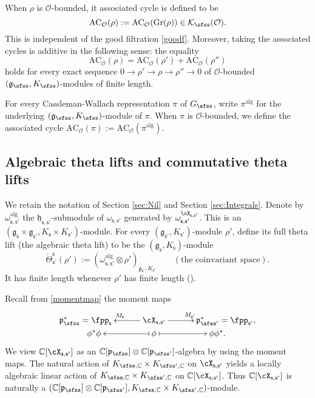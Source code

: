 \documentclass[12pt,a4paper]{amsart}
\newcommand{\CK}{{\mathcal {K}}}
\newcommand{\CO}{{\mathcal {O}}}
\newcommand{\oS}{\operatorname{S}}
\newcommand{\g}{\mathfrak g}
\newcommand{\h}{\mathfrak h}
\newcommand{\p}{\mathfrak p}
\numberwithin{equation}{section}
\theoremstyle{remark}
\begin{document}
When $\rho$ is  $\CO$-bounded, it associated cycle is defined to be
\[
   \mathrm{AC}_\CO(\rho):= \mathrm{AC}_\CO(\mathrm{Gr}(\rho))\in  \CK_\sfss(\CO).
\]
This is independent of the good filtration \eqref{goodf}. Moreover, taking the associated cycles is additive in the following sense: the equality
\[
 \mathrm{AC}_\CO(\rho)= \mathrm{AC}_\CO(\rho')+ \mathrm{AC}_\CO(\rho'')
\]
holds for every exact sequence
$0\rightarrow \rho'\rightarrow \rho\rightarrow \rho''\rightarrow 0$ of  $\CO$-bounded  $(\g_\sfss, K_{\sfss})$-modules of finite length.

For every Cassleman-Wallach representation $\pi$ of $G_\sfss$, write $\pi^{\mathrm{alg}}$ for the underlying $(\g_\sfss, K_\sfss)$-module of $\pi$. When $\pi$ is $\CO$-bounded, we define the associated cycle $\mathrm{AC}_\CO(\pi):=\mathrm{AC}_\CO(\pi^{\mathrm{alg}})$.


\subsection{Algebraic theta lifts and commutative theta lifts}


We retain the notation of Section \ref{sec:Nil} and Section \ref{sec:Integrals}.
Denote by $\omega^{\mathrm{alg}}_{\mathsf s, \mathsf s'}$ the $\h_{\mathsf s, \mathsf s'}$-submodule of $\omega_{\mathsf s, \mathsf s'}$ generated by  $ \omega_{\mathsf s, \mathsf s'}^{\cX_{\mathsf s, \mathsf s'}}$. This is an $(\g_\mathsf s\times \g_{\mathsf s'}, K_\mathsf s\times K_{\mathsf s'})$-module. For every $ (\g_{\mathsf s'}, K_{\mathsf s'})$-module $\rho'$, define its full theta lift (the algebraic theta lift) to be the $(\g_{\mathsf s}, K_{\mathsf s})$-module
\[
   \check \Theta_{\mathsf s'}^{\mathsf s}(\rho'):=(\omega^{\mathrm{alg}}_{\mathsf s, \mathsf s'}\otimes \rho')_{\g_{\mathsf s'}, K_{\mathsf s'}} \qquad (\textrm{the  coinvariant space}).
\]
It has finite length whenever $\rho'$ has finite length (\cite[Section 4]{Howe89}). 



Recall from \eqref{momentmap} the moment maps
  \[
    \xymatrix@R=0em@C=3.0em{
     \p_\sfss^*=\fpp_\mathsf s &\ar[l]_{M_\mathsf s} \cX_{\mathsf s, \mathsf s'}\ar[r]^{M_{\mathsf s'}}& \p_{\sfss'}^*=\fpp_{\mathsf s'},\\
    \qquad \phi^* \phi  &\ar@{|->}[l] \phi \ar@{|->}[r] & \phi \phi^*.\qquad
    }
  \]
We view $\C[\cX_{\mathsf s, \mathsf s'}]$ as an $\C[\p_\sfss]\otimes \C[\p_{\sfss'}]$-algebra by using the moment maps. The natural action of $K_{\sfss,\C}\times K_{\sfss',\C}$ on $\cX_{\mathsf s, \mathsf s'}$ yields a locally algebraic linear action of  $K_{\sfss,\C}\times K_{\sfss',\C}$ on $\C[\cX_{\mathsf s, \mathsf s'}]$. Thus $\C[\cX_{\mathsf s, \mathsf s'}]$  is naturally a  $(\C[\p_{\sfss}]\otimes \C[\p_{\sfss'}], K_{\sfss, \C}\times K_{\sfss', \C})$-module.
\end{document}
